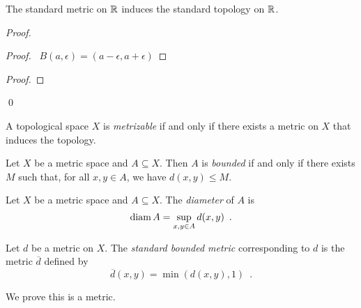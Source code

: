 \begin{proposition}
    The standard metric on $\mathbb{R}$ induces the standard topology on $\mathbb{R}$.
\end{proposition}

\begin{proof}
    \pf
    \begin{proof}
        \pf\ $B(a, \epsilon) = (a - \epsilon, a + \epsilon)$
    \end{proof}
    \begin{proof}
    \end{proof}
    \qed
\end{proof}

\begin{definition}[Metrizable]
    A topological space $X$ is \emph{metrizable} if and only if there exists a metric on $X$ that induces the topology.
\end{definition}

\begin{definition}[Bounded]
    Let $X$ be a metric space and $A \subseteq X$. Then $A$ is \emph{bounded} if and only if there exists $M$ such that,
    for all $x, y \in A$, we have $d(x,y) \leq M$.
\end{definition}

\begin{definition}[Diameter]
    Let $X$ be a metric space and $A \subseteq X$. The \emph{diameter} of $A$ is
    \[ \operatorname{diam} A = \sup_{x,y \in A} d(x,y) \enspace . \]
\end{definition}

\begin{definition}
    Let $d$ be a metric on $X$. The \emph{standard bounded metric} corresponding to $d$ is the metric $\overline{d}$ defined by
    \[ \overline{d}(x,y) = \min(d(x,y),1) \enspace . \]
\end{definition}

We prove this is a metric.

